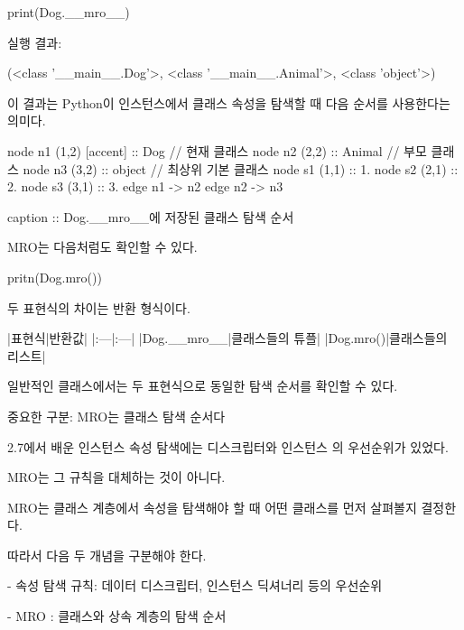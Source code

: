 \begin{dhkcode}
print(Dog.__mro__)
\end{dhkcode}

실행 결과:

\begin{dhkzsh}
(<class '__main__.Dog'>,
 <class '__main__.Animal'>,
 <class 'object'>)
\end{dhkzsh}

이 결과는 Python이  인스턴스에서 클래스 속성을 탐색할 때 다음 순서를 사용한다는 의미다.

\begin{dhkgraph}[uniform]
node n1 (1,2) [accent] :: Dog // 현재 클래스
node n2 (2,2) :: Animal // 부모 클래스
node n3 (3,2) :: object // 최상위 기본 클래스
node s1 (1,1) :: 1.
node s2 (2,1) :: 2.
node s3 (3,1) :: 3.
edge n1 -> n2
edge n2 -> n3

caption :: Dog.__mro__에 저장된 클래스 탐색 순서
\end{dhkgraph}

MRO는 다음처럼도 확인할 수 있다.

\begin{dhkcode}
pritn(Dog.mro())
\end{dhkcode}

두 표현식의 차이는 반환 형식이다.

\begin{dhktable}
|표현식|반환값|
|:---|:---|
|Dog.__mro__|클래스들의 튜플|
|Dog.mro()|클래스들의 리스트|
\end{dhktable}

일반적인 클래스에서는 두 표현식으로 동일한 탐색 순서를 확인할 수 있다.

\begin{dhknote}
\begin{dhksmry}[centered]
중요한 구분: MRO는 클래스 탐색 순서다
\end{dhksmry}
\end{dhknote}

2.7에서 배운 인스턴스 속성 탐색에는 디스크립터와 인스턴스 의 우선순위가 있었다.

MRO는 그 규칙을 대체하는 것이 아니다.

MRO는 클래스 계층에서 속성을 탐색해야 할 때 어떤 클래스를 먼저 살펴볼지 결정한다.

따라서 다음 두 개념을 구분해야 한다.

\begin{dhksmry}
- 속성 탐색 규칙: 데이터 디스크립터, 인스턴스 딕셔너리 등의 우선순위

- MRO : 클래스와 상속 계층의 탐색 순서
\end{dhksmry}

